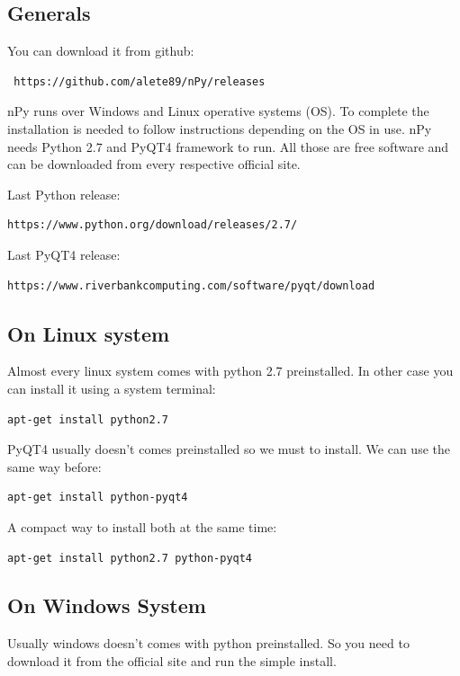 \documentclass[a4paper,10pt]{article}
\begin{document}
\subsection{Generals}

You can download it from github: 
\begin{verbatim}
 https://github.com/alete89/nPy/releases
\end{verbatim}

nPy runs over Windows and Linux operative systems (OS). To complete the installation is needed to follow instructions depending on the OS in use. nPy needs Python 2.7 and PyQT4 framework to run. All those are free software and can be downloaded from every respective official site.

Last Python release: \begin{verbatim}
https://www.python.org/download/releases/2.7/
\end{verbatim}

Last PyQT4 release: \begin{verbatim}    
https://www.riverbankcomputing.com/software/pyqt/download
\end{verbatim}
  
\subsection{On Linux system}

Almost every linux system comes with python 2.7 preinstalled. In other case you can install it using a system terminal:
\begin{verbatim}
apt-get install python2.7
\end{verbatim}

\noindent PyQT4 usually doesn't comes preinstalled so we must to install. We can use the same way before:
\begin{verbatim}
apt-get install python-pyqt4 
\end{verbatim}

\noindent  A compact way to install both at the same time:
\begin{verbatim}
apt-get install python2.7 python-pyqt4 
\end{verbatim}

\subsection{On Windows System}

Usually windows doesn't comes with python preinstalled. So you need to download it from the official site and run the simple install.
\end{document}
